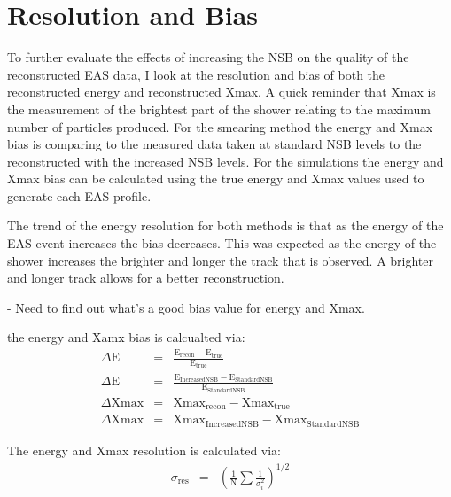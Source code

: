 \section{Resolution and Bias}

To further evaluate the effects of increasing the NSB on the quality of the reconstructed EAS data, I look at the resolution and bias of both the reconstructed energy and reconstructed Xmax. A quick reminder that Xmax is the measurement of the brightest part of the shower relating to the maximum number of particles produced. For the smearing method the energy and Xmax bias is comparing to the measured data taken at standard NSB levels to the reconstructed with the increased NSB levels. For the simulations the energy and Xmax bias can be calculated using the true energy and Xmax values used to generate each EAS profile.

The trend of the energy resolution for both methods is that as the energy of the EAS event increases the bias decreases. This was expected as the energy of the shower increases the brighter and longer the track that is observed. A brighter and longer track allows for a better reconstruction.

- Need to find out what's a good bias value for energy and Xmax.

the energy and Xamx bias is calcualted via:
\begin{eqnarray}
\Delta \mathrm{E} &=& \frac{\mathrm{E}_{\mathrm{recon}} - \mathrm{E}_{\mathrm{true}}}{\mathrm{E}_{\mathrm{true}}} \\ 
\Delta \mathrm{E} &=& \frac{\mathrm{E}_{\mathrm{IncreasedNSB}} - \mathrm{E}_{\mathrm{StandardNSB}}}{\mathrm{E}_{\mathrm{StandardNSB}}} \\
\Delta \mathrm{Xmax} &=& \mathrm{Xmax}_{\mathrm{recon}} - \mathrm{Xmax}_{\mathrm{true}} \\
\Delta \mathrm{Xmax} &=& \mathrm{Xmax}_{\mathrm{IncreasedNSB}} - \mathrm{Xmax}_{\mathrm{StandardNSB}}
\end{eqnarray}

The energy and Xmax resolution is calculated via:
\begin{eqnarray}
\sigma_{\mathrm{res}} &=& \left( \frac{1}{\mathrm{N}} \sum \frac{1}{\sigma^2_i} \right)^{1/2}
\end{eqnarray}


